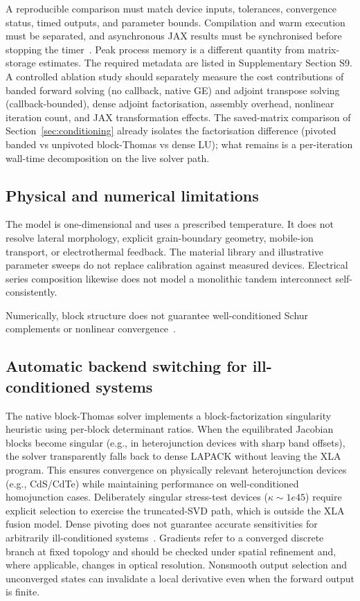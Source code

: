 A reproducible comparison must match device inputs, tolerances,
convergence status, timed outputs, and parameter bounds. Compilation and
warm execution must be separated, and asynchronous JAX results must be
synchronised before stopping the timer~\cite{jaxbenchmark}. Peak process
memory is a different quantity from matrix-storage estimates. The
required metadata are listed in Supplementary Section S9. A controlled
ablation study should separately measure the cost contributions of
banded forward solving (no callback, native GE) and adjoint transpose solving (callback-bounded), dense
adjoint factorisation, assembly overhead, nonlinear iteration count,
and JAX transformation effects. The saved-matrix comparison of
Section~\ref{sec:conditioning} already isolates the factorisation
difference (pivoted banded vs unpivoted block-Thomas vs dense LU);
what remains is a per-iteration wall-time decomposition on the live
solver path.

\subsection{Physical and numerical limitations}
The model is one-dimensional and uses a prescribed temperature. It does
not resolve lateral morphology, explicit grain-boundary geometry,
mobile-ion transport, or electrothermal feedback. The material library
and illustrative parameter sweeps do not replace calibration against
measured devices. Electrical series composition likewise does not model
a monolithic tandem interconnect self-consistently.

Numerically, block structure does not guarantee well-conditioned Schur
complements or nonlinear convergence~\cite{demmel1995,kelley1996}.
    
\subsection{Automatic backend switching for ill-conditioned systems}
The native block-Thomas solver implements a block-factorization singularity heuristic using per-block determinant
ratios. When the equilibrated Jacobian
blocks become singular (e.g., in heterojunction devices with sharp band
offsets), the solver transparently falls back to dense LAPACK 
without leaving the XLA program. This ensures convergence on physically
relevant heterojunction devices (e.g., CdS/CdTe) while maintaining performance
on well-conditioned homojunction cases. Deliberately singular stress-test
devices ($\kappa\sim1e45$) require explicit  selection to exercise
the truncated-SVD path, which is outside the XLA fusion model.
Dense pivoting does not guarantee accurate sensitivities for arbitrarily
ill-conditioned systems~\cite{lapack1999}. Gradients
refer to a converged discrete branch at fixed topology and should be
checked under spatial refinement and, where applicable, changes in
optical resolution. Nonsmooth output selection and unconverged states
can invalidate a local derivative even when the forward output is finite.

